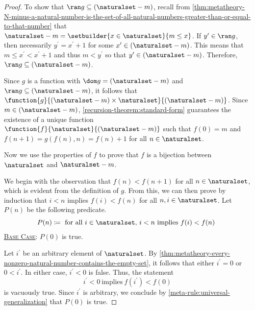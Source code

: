 \begin{proof}
    \vspace{0.3cm}
    \noindent
    To show that \( \ran g \subseteq \mleft( \naturalset - m \mright) \),
    recall from \cref{thm:metatheory-N-minus-a-natural-number-is-the-set-of-all-natural-numbers-greater-than-or-equal-to-that-number}
    that \( \naturalset - m = \setbuilder{x \in \naturalset}{m \leq x} \).
    If \( y^{\prime} \in \ran g \), then necessarily \( y^{\prime} = x^{\prime} + 1 \) for some \( x^{\prime} \in \mleft( \naturalset - m \mright) \).
    This means that \( m \leq x^{\prime} < x^{\prime} + 1 \) and thus \( m < y^{\prime} \) so that \( y^{\prime} \in \mleft( \naturalset - m \mright) \).
    Therefore, \( \ran g \subseteq \mleft( \naturalset - m \mright) \).

    \vspace{0.3cm}
    \noindent
    Since \( g \) is a function with \( \dom g = \mleft( \naturalset - m \mright) \) and \( \ran g \subseteq \mleft( \naturalset - m \mright) \), it follows
    that \( \function{g}{\mleft( \naturalset - m \mright) \times \naturalset}{\mleft( \naturalset - m \mright)} \).
    Since \( m \in \mleft( \naturalset - m \mright) \),
    \cref{recursion-theorem:standard-form} guarantees the existence of a unique function \( \function{f}{\naturalset}{\mleft( \naturalset - m \mright)} \)
    such that \( f(0) = m \) and \( f(n + 1) = g(f(n), n) = f(n) + 1 \) for all \( n \in \naturalset \).

    \vspace{0.3cm}
    \noindent
    Now we use the properties of \( f \) to prove that \( f \) is a bijection between \( \naturalset \) and \( \naturalset - m \).

    \vspace{0.3cm}
    \noindent
    We begin with the observation that \( f(n) < f(n + 1) \) for all \( n \in \naturalset \), which is evident from the definition of \( g \).
    From this, we can then prove by induction that \( i < n \) implies \( f(i) < f(n) \) for all \( n, i \in \naturalset \).
    Let \( P(n) \) be the following predicate.
    \begin{equation*}
        P(n) \coloneq \text{ for all \( i \in \naturalset \), \( i < n \) implies \( f(i) < f(n) \) }
    \end{equation*}
    \noindent
    \underline{\scshape Base Case}: \( P(0) \) is true.

    \vspace{0.3cm}
    \noindent
    Let \( i^{\prime} \) be an arbitrary element of \( \naturalset \).
    By \cref{thm:metatheory-every-nonzero-natural-number-contains-the-empty-set}, it follows that either \( i^{\prime} = 0 \)
    or \( 0 < i^{\prime} \).
    In either case, \( i^{\prime} < 0 \) is false.
    Thus, the statement
    \begin{equation*}
        i^{\prime} < 0 \ \text{implies} \ f(i^{\prime}) < f(0)
    \end{equation*}
    is vacuously true.
    Since \( i^{\prime} \) is arbitrary, we conclude by \cref{meta-rule:universal-generalization} that
    \( P(0) \) is true.


\end{proof}
